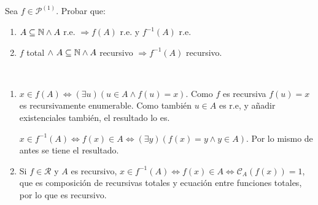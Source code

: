 \documentclass[twoside]{article}
\newcommand{\sii}{{\Leftrightarrow}}
\begin{document}
\newpage

\begin{ejercicio}{4}
Sea $f \in \mathcal{P}^{(1)}$. Probar que:
\begin{enumerate}
	\item $A \subseteq \mathbb{N} \land A$ r.e. $\Rightarrow f(A)$ r.e. y $f^{-1}(A)$ r.e.
	\item $f$ total $\land\ A \subseteq \mathbb{N} \land A$ recursivo $\Rightarrow f^{-1}(A)$ recursivo.
\end{enumerate}
\end{ejercicio}
\begin{solucion}\
\begin{enumerate}
\item $x\in f(A)\sii (\exists u) (u\in A\land f(u)=x)$. Como $f$ es recursiva $f(u)=x$ es recursivamente enumerable. Como también $u\in A$ es r.e, y añadir existenciales también, el resultado lo es. 

$x\in f^{-1}(A)\sii f(x)\in A\sii (\exists y) (f(x)=y\land y\in A)$. Por lo mismo de antes se tiene el resultado. 

\item Si $f\in\mathcal{R}$ y $A$ es recursivo, $x\in f^{-1}(A)\sii f(x)\in A\sii \mathcal{C}_A(f(x))=1$, que es composición de recursivas totales y ecuación entre funciones totales, por lo que es recursivo.
\end{enumerate}
\end{solucion}

\newpage
\end{document}
